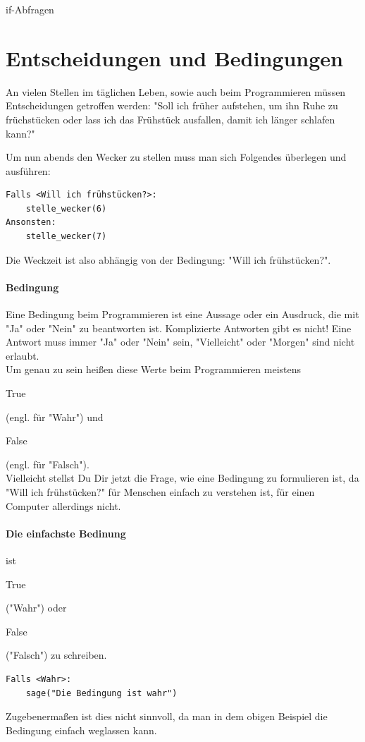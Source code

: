 \documentclass[12pt,a4paper,oneside,ngerman]{scrbook}
\newcommand{\code}[1]{
	\begin{ttfamily}#1\end{ttfamily}
}
\newcommand{\hmwkTitle}{if-Abfragen}
\begin{document}
\begin{center}
	{\huge \hmwkTitle}
\end{center}

\section{Entscheidungen und Bedingungen}
An vielen Stellen im täglichen Leben, sowie auch beim Programmieren müssen Entscheidungen getroffen werden:
"Soll ich früher aufstehen, um ihn Ruhe zu früchstücken oder lass ich das Frühstück ausfallen, damit ich länger schlafen kann?"
	
Um nun abends den Wecker zu stellen muss man sich Folgendes überlegen und ausführen:

\begin{lstlisting}[style=Pseudo]
Falls <Will ich frühstücken?>:
	stelle_wecker(6)
Ansonsten:
	stelle_wecker(7)
\end{lstlisting}

Die Weckzeit ist also abhängig von der Bedingung: "Will ich frühstücken?".

\paragraph{Bedingung} Eine Bedingung beim Programmieren ist eine Aussage oder ein Ausdruck,
die mit "Ja" oder "Nein" zu beantworten ist. Komplizierte Antworten gibt es nicht! Eine Antwort
muss immer "Ja" oder "Nein" sein, "Vielleicht" oder "Morgen" sind nicht erlaubt.
\\
Um genau zu sein heißen diese Werte beim Programmieren meistens \code{True} (engl. für "Wahr") und \code{False} (engl. für "Falsch").
\\
Vielleicht stellst Du Dir jetzt die Frage, wie eine Bedingung zu formulieren ist, da "Will ich frühstücken?" für Menschen einfach zu verstehen ist, für einen Computer allerdings nicht.

\paragraph{Die einfachste Bedinung} ist \code{True}("Wahr") oder \code{False} ("Falsch") zu schreiben.
\begin{lstlisting}[style=Pseudo]
Falls <Wahr>:
	sage("Die Bedingung ist wahr")
\end{lstlisting}
Zugebenermaßen ist dies nicht sinnvoll, da man in dem obigen Beispiel die Bedingung einfach weglassen kann.
	
\end{document}

